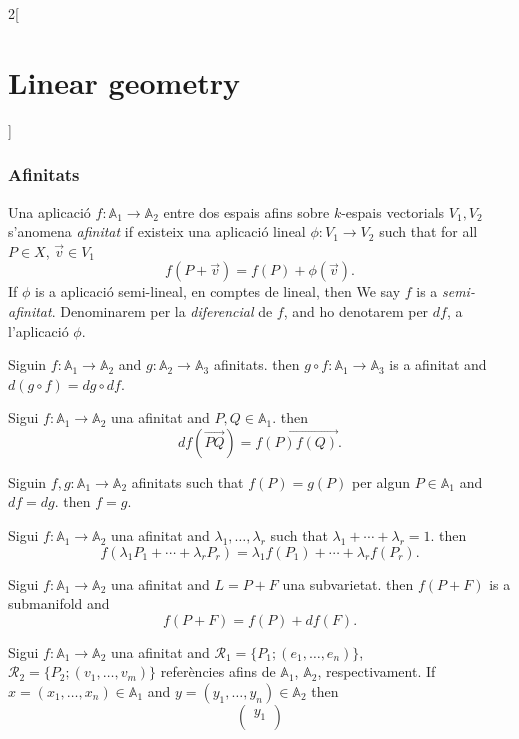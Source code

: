 \documentclass[class=article,10pt,crop=false]{standalone}
\begin{document}
\begin{multicols}{2}[\section{Linear geometry}]
\subsubsection{Afinitats}
\begin{definition}
Una aplicació $f:\mathbb{A}_1\rightarrow\mathbb{A}_2$ entre dos espais afins sobre $k$-espais vectorials $V_1,V_2$ s'anomena \textit{afinitat} if existeix una aplicació lineal $\phi:V_1\rightarrow V_2$ such that for all $P\in X$, $\overrightarrow{v}\in V_1$ $$f(P+\overrightarrow{v})=f(P)+\phi(\overrightarrow{v}).$$ If $\phi$ is a aplicació semi-lineal, en comptes de lineal, then We say $f$ is a \textit{semi-afinitat}. Denominarem per la \textit{diferencial} de $f$, and ho denotarem per $df$, a l'aplicació $\phi$. 
\end{definition}
\begin{prop}
Siguin $f:\mathbb{A}_1\rightarrow\mathbb{A}_2$ and $g:\mathbb{A}_2\rightarrow\mathbb{A}_3$ afinitats. then $g\circ f:\mathbb{A}_1\rightarrow\mathbb{A}_3$ is a afinitat and $d(g\circ f)=dg\circ df$.
\end{prop}
\begin{prop}
Sigui $f:\mathbb{A}_1\rightarrow\mathbb{A}_2$ una afinitat and $P,Q\in\mathbb{A}_1$. then $$df(\overrightarrow{PQ})=\overrightarrow{f(P)f(Q)}.$$
\end{prop}
\begin{prop}
Siguin $f,g:\mathbb{A}_1\rightarrow\mathbb{A}_2$ afinitats such that $f(P)=g(P)$ per algun $P\in\mathbb{A}_1$ and $df=dg$. then $f=g$.
\end{prop}
\begin{prop}
Sigui $f:\mathbb{A}_1\rightarrow\mathbb{A}_2$ una afinitat and $\lambda_1,\ldots,\lambda_r$ such that $\lambda_1+\cdots+\lambda_r=1$. then $$f(\lambda_1P_1+\cdots+\lambda_rP_r)=\lambda_1f(P_1)+\cdots+\lambda_rf(P_r).$$
\end{prop}
\begin{prop}
Sigui $f:\mathbb{A}_1\rightarrow\mathbb{A}_2$ una afinitat and $L=P+F$ una subvarietat. then $f(P+F)$ is a submanifold and $$f(P+F)=f(P)+df(F).$$
\end{prop}
\begin{prop}
Sigui $f:\mathbb{A}_1\rightarrow\mathbb{A}_2$ una afinitat and $\mathcal{R}_1=\{P_1;(e_1,\ldots,e_n)\}$, $\mathcal{R}_2=\{P_2;(v_1,\ldots,v_m)\}$ referències afins de $\mathbb{A}_1$, $\mathbb{A}_2$, respectivament. If $x=(x_1,\ldots,x_n)\in\mathbb{A}_1$ and $y=(y_1,\ldots,y_n)\in\mathbb{A}_2$ then 
$$\begin{pmatrix}
y_1 \\

\end{pmatrix}$$
\end{prop}
\end{multicols}
\end{document}
